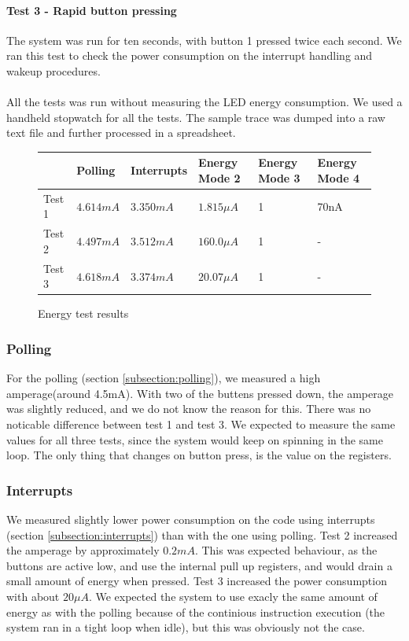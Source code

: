 		\paragraph{Test 3 - Rapid button pressing}
		The system was run for ten seconds, with button 1 pressed twice each second. We ran this test to check the power consumption on the interrupt handling and wakeup procedures.
\\
\\
		All the tests was run without measuring the LED energy consumption. We used a handheld stopwatch for all the tests. The sample trace was dumped into a raw text file and further processed in a spreadsheet.


		\begin{figure}[t]

			\begin{tabular}{l | l | l | l | l | l}
				& Polling & Interrupts & Energy Mode 2 & Energy Mode 3 & Energy Mode 4 \\
				\hline
				Test 1 & $4.614mA$ & $3.350mA$ & $1.815\mu A$ & 1 & 70nA \\
				Test 2 & $4.497mA$ & $3.512mA$ & $160.0\mu A$ & 1 & - \\
				Test 3 & $4.618mA$ & $3.374mA$ & $20.07\mu A$ & 1 & - \\
			\end{tabular}
			\caption{Energy test results}
			\label{fig:test_results}
		\end{figure}

		\subsubsection{Polling}
		For the polling (section \ref{subsection:polling}), we measured a high amperage(around 4.5mA). With two of the buttens pressed down, the amperage was slightly reduced, and we do not know the reason for this. There was no noticable difference between test 1 and test 3. We expected to measure the same values for all three tests, since the system would keep on spinning in the same loop. The only thing that changes on button press, is the value on the registers.

		\subsubsection{Interrupts}
		We measured slightly lower power consumption on the code using interrupts (section \ref{subsection:interrupts}) than with the one using polling. Test 2 increased the amperage by approximately $0.2mA$. This was expected behaviour, as the buttons are active low, and use the internal pull up registers, and would drain a small amount of energy when pressed. Test 3 increased the power consumption with about $20\mu A$. We expected the system to use exacly the same amount of energy as with the polling because of the continious instruction execution (the system ran in a tight loop when idle), but this was obviously not the case.

